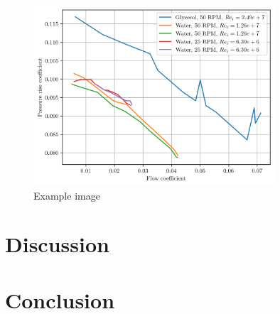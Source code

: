 \documentclass{article}
\begin{document}
\begin{figure}[H]
    \centering
    \includegraphics[width=0.8\textwidth]{compressor_non_dims.png}
    \caption{Example image}
    \label{fig:example-image-a}
\end{figure}

\section{Discussion}









\section{Conclusion}
\end{document}
